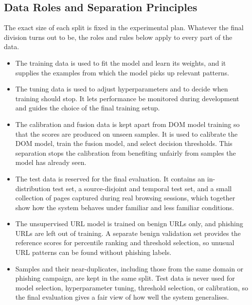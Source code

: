 \documentclass{FastFyp}
\begin{document}
\subsection{Data Roles and Separation Principles}
\label{sec:roles}
The exact size of each split is fixed in the experimental plan. Whatever the final division turns out to be, the roles and rules below apply to every part of the data.
\begin{itemize}
    \item The training data is used to fit the model and learn its weights, and it supplies the examples from which the model picks up relevant patterns.
    \item The tuning data is used to adjust hyperparameters and to decide when training should stop. It lets performance be monitored during development and guides the choice of the final training setup.
    \item The calibration and fusion data is kept apart from DOM model training so that the scores are produced on unseen samples. It is used to calibrate the DOM model, train the fusion model, and select decision thresholds. This separation stops the calibration from benefiting unfairly from samples the model has already seen.
    \item The test data is reserved for the final evaluation. It contains an in-distribution test set, a source-disjoint and temporal test set, and a small collection of pages captured during real browsing sessions, which together show how the system behaves under familiar and less familiar conditions.
    \item The unsupervised URL model is trained on benign URLs only, and phishing URLs are left out of training. A separate benign validation set provides the reference scores for percentile ranking and threshold selection, so unusual URL patterns can be found without phishing labels.
    \item Samples and their near-duplicates, including those from the same domain or phishing campaign, are kept in the same split. Test data is never used for model selection, hyperparameter tuning, threshold selection, or calibration, so the final evaluation gives a fair view of how well the system generalises.
\end{itemize}
\end{document}
